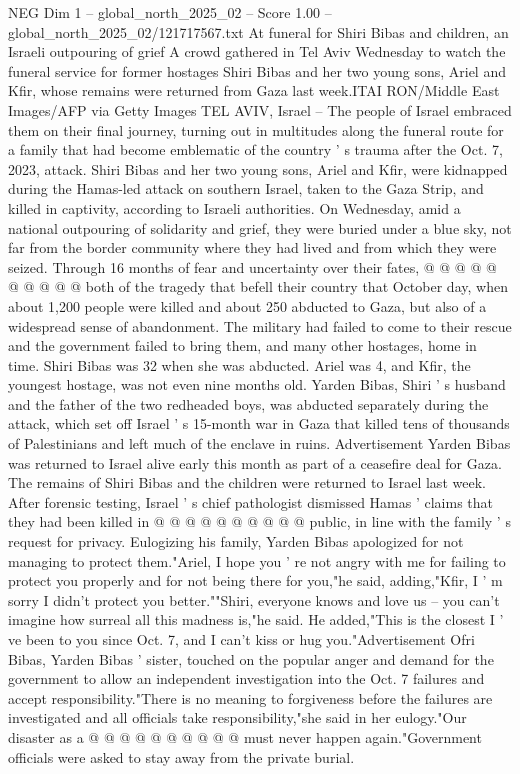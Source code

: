 \begin{textsample}{NEG Dim 1 – global\_north\_2025\_02 – Score 1.00 – global\_north\_2025\_02/121717567.txt}  \label{ex:f1_neg_014}
At funeral for Shiri Bibas and children, an Israeli outpouring of grief A crowd gathered in Tel Aviv Wednesday to watch the funeral service for former hostages Shiri Bibas and her two young sons, Ariel and Kfir, whose remains were returned from Gaza last week.ITAI RON/Middle East Images/AFP via Getty Images TEL AVIV, Israel -- The people of Israel embraced them on their final journey, turning out in multitudes along the funeral route for a family that had become emblematic of the country ' s trauma after the Oct. 7, 2023, attack.
Shiri Bibas and her two young sons, Ariel and Kfir, were kidnapped during the Hamas-led attack on southern Israel, taken to the Gaza Strip, and killed in captivity, according to Israeli authorities.
On Wednesday, amid a national outpouring of solidarity and grief, they were buried under a blue sky, not far from the border community where they had lived and from which they were seized.
Through 16 months of fear and uncertainty over their fates, @ @ @ @ @ @ @ @ @ @ both of the tragedy that befell their country that October day, when about 1,200 people were killed and about 250 abducted to Gaza, but also of a widespread sense of abandonment.
The military had failed to come to their rescue and the government failed to bring them, and many other hostages, home in time.
Shiri Bibas was 32 when she was abducted.
Ariel was 4, and Kfir, the youngest hostage, was not even nine months old.
Yarden Bibas, Shiri ' s husband and the father of the two redheaded boys, was abducted separately during the attack, which set off Israel ' s 15-month war in Gaza that killed tens of thousands of Palestinians and left much of the enclave in ruins.
Advertisement Yarden Bibas was returned to Israel alive early this month as part of a ceasefire deal for Gaza.
The remains of Shiri Bibas and the children were returned to Israel last week.
After forensic testing, Israel ' s chief pathologist dismissed Hamas ' claims that they had been killed in @ @ @ @ @ @ @ @ @ @ public, in line with the family ' s request for privacy.
Eulogizing his family, Yarden Bibas apologized for not managing to protect them."Ariel, I hope you ' re not angry with me for failing to protect you properly and for not being there for you,"he said, adding,"Kfir, I ' m sorry I didn't protect you better.""Shiri, everyone knows and love us -- you can't imagine how surreal all this madness is,"he said.
He added,"This is the closest I ' ve been to you since Oct. 7, and I can't kiss or hug you."Advertisement Ofri Bibas, Yarden Bibas ' sister, touched on the popular anger and demand for the government to allow an independent investigation into the Oct. 7 failures and accept responsibility."There is no meaning to forgiveness before the failures are investigated and all officials take responsibility,"she said in her eulogy."Our disaster as a @ @ @ @ @ @ @ @ @ @ must never happen again."Government officials were asked to stay away from the private burial.

\end{textsample}
